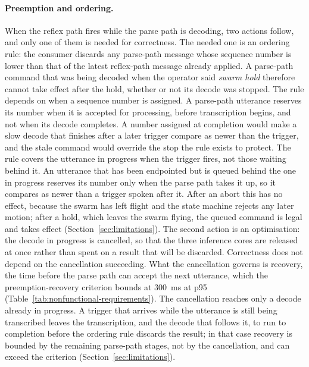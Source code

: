 \paragraph{Preemption and ordering.} When the reflex path fires while the parse path is decoding,
two actions follow, and only one of them is needed for correctness. The needed one is an ordering
rule: the consumer discards any parse-path message whose sequence number is lower than that of the
latest reflex-path message already applied. A parse-path command that was being decoded when the
operator said \emph{swarm hold} therefore cannot take effect after the hold, whether or not its
decode was stopped. The rule depends on when a sequence number is assigned. A parse-path utterance
reserves its number when it is accepted for processing, before transcription begins, and not when
its decode completes. A number assigned at completion would make a slow decode that finishes after a
later trigger compare as newer than the trigger, and the stale command would override the stop the
rule exists to protect. The rule covers the utterance in progress when the trigger fires, not those
waiting behind it. An utterance that has been endpointed but is queued behind the one in progress
reserves its number only when the parse path takes it up, so it compares as newer than a trigger
spoken after it. After an abort this has no effect, because the swarm has left flight and the state
machine rejects any later motion; after a hold, which leaves the swarm flying, the queued command is
legal and takes effect (Section~\ref{sec:limitations}). The second action is an optimisation: the
decode in progress is cancelled, so that the three inference cores are released at once rather than
spent on a result that will be discarded. Correctness does not depend on the cancellation
succeeding. What the cancellation governs is recovery, the time before the parse path can accept
the next utterance, which the preemption-recovery criterion bounds at 300~ms at p95
(Table~\ref{tab:nonfunctional-requirements}). The cancellation reaches only a decode already in
progress. A trigger that arrives while the utterance is still being transcribed leaves the
transcription, and the decode that follows it, to run to completion before the ordering rule
discards the result; in that case recovery is bounded by the remaining parse-path stages, not by
the cancellation, and can exceed the criterion (Section~\ref{sec:limitations}).


